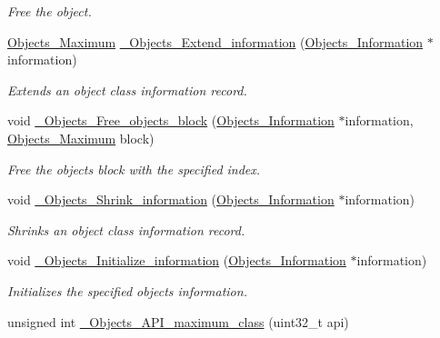 \begin{DoxyCompactItemize}
\begin{DoxyCompactList}\small\item\em Free the object. \end{DoxyCompactList}\item 
\mbox{\hyperlink{group__RTEMSScoreObject_gaa2735357885ec7d7157c32f3f835f9ae}{Objects\+\_\+\+Maximum}} \mbox{\hyperlink{group__RTEMSScoreObject_gaf7d69e3b4cf8305b8f880a8362024fb8}{\+\_\+\+Objects\+\_\+\+Extend\+\_\+information}} (\mbox{\hyperlink{structObjects__Information}{Objects\+\_\+\+Information}} $\ast$information)
\begin{DoxyCompactList}\small\item\em Extends an object class information record. \end{DoxyCompactList}\item 
void \mbox{\hyperlink{group__RTEMSScoreObject_ga53e22e0d0d91b0f5159aff84a1c40ef3}{\+\_\+\+Objects\+\_\+\+Free\+\_\+objects\+\_\+block}} (\mbox{\hyperlink{structObjects__Information}{Objects\+\_\+\+Information}} $\ast$information, \mbox{\hyperlink{group__RTEMSScoreObject_gaa2735357885ec7d7157c32f3f835f9ae}{Objects\+\_\+\+Maximum}} block)
\begin{DoxyCompactList}\small\item\em Free the objects block with the specified index. \end{DoxyCompactList}\item 
void \mbox{\hyperlink{group__RTEMSScoreObject_ga1d3e97a3ed2e9d19c544269a7444be21}{\+\_\+\+Objects\+\_\+\+Shrink\+\_\+information}} (\mbox{\hyperlink{structObjects__Information}{Objects\+\_\+\+Information}} $\ast$information)
\begin{DoxyCompactList}\small\item\em Shrinks an object class information record. \end{DoxyCompactList}\item 
void \mbox{\hyperlink{group__RTEMSScoreObject_ga968b850454008bc4e68ab83c2f033282}{\+\_\+\+Objects\+\_\+\+Initialize\+\_\+information}} (\mbox{\hyperlink{structObjects__Information}{Objects\+\_\+\+Information}} $\ast$information)
\begin{DoxyCompactList}\small\item\em Initializes the specified objects information. \end{DoxyCompactList}\item 
unsigned int \mbox{\hyperlink{group__RTEMSScoreObject_ga160a712acafe6e9c4a8b9ea6dcc2597b}{\+\_\+\+Objects\+\_\+\+A\+P\+I\+\_\+maximum\+\_\+class}} (uint32\+\_\+t api)

\end{DoxyCompactItemize}
